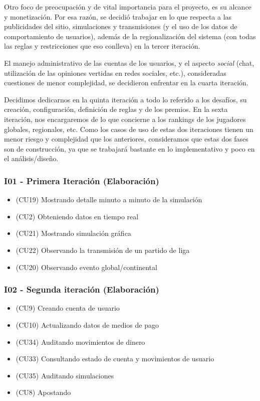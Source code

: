 Otro foco de preocupación y de vital importancia para el proyecto, es su alcance y monetización. Por esa razón, se decidió trabajar en lo que respecta a las publicidades del sitio, simulaciones y transmisiones (y el uso de los datos de comportamiento de usuarios), además de la regionalización del sistema (con todas las reglas y restricciones que eso conlleva) en la tercer iteración.

El manejo administrativo de las cuentas de los usuarios, y el aspecto \emph{social} (chat, utilización de las opiniones vertidas en redes sociales, etc.), consideradas cuestiones de menor complejidad, se decidieron enfrentar en la cuarta iteración.

Decidimos dedicarnos en la quinta iteración a todo lo referido a los desafíos, su creación, configuración, definición de reglas y de los premios. En la sexta iteración, nos encargaremos de lo que concierne a los rankings de los jugadores globales, regionales, etc. Como los casos de uso de estas dos iteraciones tienen un menor riesgo y complejidad que los anteriores, consideramos que estas dos fases son de construcción, ya que se trabajará bastante en lo implementativo y poco en el análisis/diseño.



\subsubsection{I01 - Primera Iteración (Elaboración)}
\begin{itemize}
\item (CU19) Mostrando detalle minuto a minuto de la simulación
\item (CU2)  Obteniendo datos en tiempo real
\item (CU21) Mostrando simulación gráfica
\item (CU22) Observando la transmisión de un partido de liga
\item (CU20) Observando evento global/continental
\end{itemize}

\subsubsection{I02 - Segunda iteración (Elaboración)} 
\begin{itemize}
\item (CU9) Creando cuenta de usuario
\item (CU10) Actualizando datos de medios de pago
\item (CU34) Auditando movimientos de dinero
\item (CU33) Consultando estado de cuenta y movimientos de usuario
\item (CU35) Auditando simulaciones
\item (CU8) Apostando
\end{itemize}


